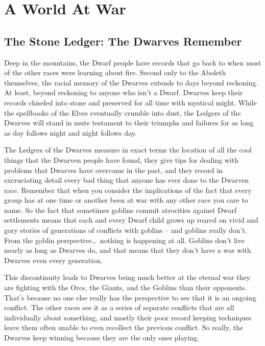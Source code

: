 \section{A World At War}
\vspace*{-10pt}

\subsection{The Stone Ledger: The Dwarves Remember}

Deep in the mountains, the Dwarf people have records that go back to when most of the other races were learning about fire. Second only to the Aboleth themselves, the racial memory of the Dwarves extends to days beyond reckoning. At least, beyond reckoning to anyone who isn't a Dwarf. Dwarves keep their records chiseled into stone and preserved for all time with mystical might. While the spellbooks of the Elves eventually crumble into dust, the Ledgers of the Dwarves will stand in mute testament to their triumphs and failures for as long as day follows night and night follows day.

The Ledgers of the Dwarves measure in exact terms the location of all the cool things that the Dwarven people have found, they give tips for dealing with problems that Dwarves have overcome in the past, and they record in excruciating detail every bad thing that anyone has ever done to the Dwarven race. Remember that when you consider the implications of the fact that every group has at one time or another been at war with any other race you care to name. So the fact that sometimes goblins commit atrocities against Dwarf settlements means that each and every Dwarf child grows up reared on vivid and gory stories of generations of conflicts with goblins -- and goblins really don't. From the goblin perspective\ldots\  nothing is happening at all. Goblins don't live nearly as long as Dwarves do, and that means that they don't have a war with Dwarves even every generation.

This discontinuity leads to Dwarves being much better at the eternal war they are fighting with the Orcs, the Giants, and the Goblins than their opponents. That's because no one else really has the perspective to see that it is an ongoing conflict. The other races see it as a series of separate conflicts that are all individually about something, and mostly their poor record keeping techniques leave them often unable to even recollect the previous conflict. So really, the Dwarves keep winning because they are the only ones playing.

